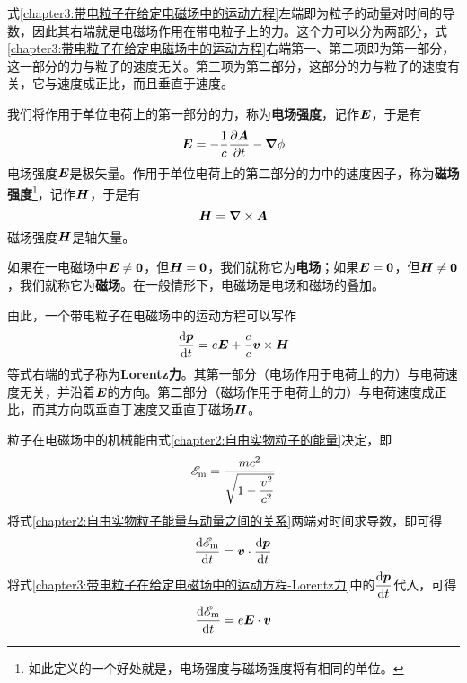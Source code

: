 式\eqref{chapter3:带电粒子在给定电磁场中的运动方程}左端即为粒子的动量对时间的导数，因此其右端就是电磁场作用在带电粒子上的力。这个力可以分为两部分，式\eqref{chapter3:带电粒子在给定电磁场中的运动方程}右端第一、第二项即为第一部分，这一部分的力与粒子的速度无关。第三项为第二部分，这部分的力与粒子的速度有关，它与速度成正比，而且垂直于速度。

我们将作用于单位电荷上的第一部分的力，称为{\bf 电场强度}，记作$\boldsymbol{E}$，于是有
\begin{equation}
	\boldsymbol{E} = - \frac1c\frac{\partial \boldsymbol{A}}{\partial t} - \boldsymbol{\nabla} \phi
	\label{chapter3:电场强度的定义}
\end{equation}
电场强度$\boldsymbol{E}$是极矢量。作用于单位电荷上的第二部分的力中的速度因子，称为{\bf 磁场强度}\footnote{如此定义的一个好处就是，电场强度与磁场强度将有相同的单位。}，记作$\boldsymbol{H}$，于是有
\begin{equation}
	\boldsymbol{H} = \boldsymbol{\nabla} \times \boldsymbol{A}
	\label{chapter3:磁场强度的定义}
\end{equation}
磁场强度$\boldsymbol{H}$是轴矢量。

如果在一电磁场中$\boldsymbol{E}\neq \boldsymbol{0}$，但$\boldsymbol{H}=\boldsymbol{0}$，我们就称它为{\bf 电场}；如果$\boldsymbol{E}= \boldsymbol{0}$，但$\boldsymbol{H}\neq \boldsymbol{0}$，我们就称它为{\bf 磁场}。在一般情形下，电磁场是电场和磁场的叠加。

由此，一个带电粒子在电磁场中的运动方程可以写作
\begin{equation}
	\frac{\mathrm{d} \boldsymbol{p}}{\mathrm{d} t} = e\boldsymbol{E}+\dfrac{e}{c}\boldsymbol{v}\times \boldsymbol{H}
	\label{chapter3:带电粒子在给定电磁场中的运动方程-Lorentz力}
\end{equation}
等式右端的式子称为{\bf Lorentz力}。其第一部分（电场作用于电荷上的力）与电荷速度无关，并沿着$\boldsymbol{E}$的方向。第二部分（磁场作用于电荷上的力）与电荷速度成正比，而其方向既垂直于速度又垂直于磁场$\boldsymbol{H}$。

粒子在电磁场中的机械能由式\eqref{chapter2:自由实物粒子的能量}决定，即
\begin{equation*}
	\mathscr{E}_{\text{m}} = \frac{mc^2}{\sqrt{1-\dfrac{v^2}{c^2}}}
\end{equation*}
将式\eqref{chapter2:自由实物粒子能量与动量之间的关系}两端对时间求导数，即可得
\begin{equation*}
	\frac{\mathrm{d} \mathscr{E}_{\text{m}}}{\mathrm{d} t} = \boldsymbol{v}\cdot \frac{\mathrm{d} \boldsymbol{p}}{\mathrm{d} t}
\end{equation*}
将式\eqref{chapter3:带电粒子在给定电磁场中的运动方程-Lorentz力}中的$\dfrac{\mathrm{d} \boldsymbol{p}}{\mathrm{d} t}$代入，可得
\begin{equation}
	\frac{\mathrm{d} \mathscr{E}_{\text{m}}}{\mathrm{d} t} = e\boldsymbol{E}\cdot \boldsymbol{v}
	\label{chapter3:电磁场中带电粒子能量的变化}
\end{equation}

